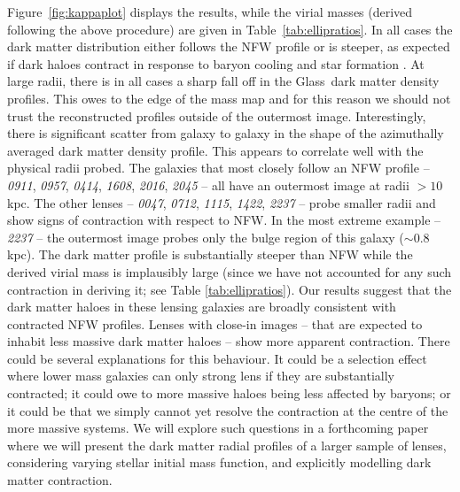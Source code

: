 \documentclass[useAMS,usenatbib]{mn2e}
\def\Glass{{\sc Glass}}
\begin{document}
Figure~\ref{fig:kappaplot} displays the results, while the virial masses (derived following the above procedure) are given in Table~\ref{tab:ellipratios}. In all cases the dark matter distribution either follows the NFW profile or is steeper, as expected if dark haloes contract in response to baryon cooling and star formation \citep[e.g.][]{1991ApJ...377..365K,1994ApJ...431..617D,2007arXiv0707.0737D}. At large radii, there is in all cases a sharp fall off in the \Glass\ dark matter density profiles. This owes to the edge of the mass map and for this reason we should not trust the reconstructed profiles outside of the outermost image. Interestingly, there is significant scatter from galaxy to galaxy in the shape of the azimuthally averaged dark matter density profile. This appears to correlate well with the physical radii probed. The galaxies that most closely follow an NFW profile -- \textit{0911}, \textit{0957}, \textit{0414}, \textit{1608}, \textit{2016}, \textit{2045} -- all have an outermost image at radii $> 10$\,kpc. The other lenses -- \textit{0047}, \textit{0712}, \textit{1115}, \textit{1422}, \textit{2237} -- probe smaller radii and show signs of contraction with respect to NFW. In the most extreme example -- \textit{2237} -- the outermost image probes only the bulge region of this galaxy ($\sim 0.8$\,kpc). The dark matter profile is substantially steeper than NFW while the derived virial mass is implausibly large (since we have not accounted for any such contraction in deriving it; see Table \ref{tab:ellipratios}). Our results suggest that the dark matter haloes in these lensing galaxies are broadly consistent with contracted NFW profiles. Lenses with close-in images -- that are expected to inhabit less massive dark matter haloes -- show more apparent contraction. There could be several explanations for this behaviour. It could be a selection effect where lower mass galaxies can only strong lens if they are substantially contracted; it could owe to more massive haloes being less affected by baryons; or it could be that we simply cannot yet resolve the contraction at the centre of the more massive systems. We will explore such questions in a forthcoming paper where we will present the dark matter radial profiles of a larger sample of lenses, considering varying stellar initial mass function, and explicitly modelling dark matter contraction.
\end{document}
